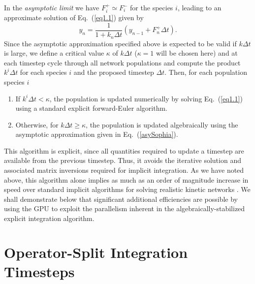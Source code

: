 \documentclass[]{elsart}
\newcommand{\fplus}[1]{F^+_{#1}}
\newcommand{\fminus}[1]{F^-_{#1}}
\newcommand{\eq}[1]{Eq.~(\ref{#1})}
\begin{document}
In the
{\em asymptotic limit} we have $\fplus i \simeq \fminus i$ for the species $i$, leading to
an approximate solution of \eq{eq1.1} given by \cite{guidAsy}
\begin{equation}
y_n = \frac{1}{1+k_n\Delta t} \left(y_{n-1} + F^+_n \Delta t \right).
\label{asySophia}
\end{equation}
Since the asymptotic approximation specified above is expected to be valid if $k\Delta t$
is large, we define a critical value $\kappa$ of $k\Delta t$ ($\kappa = 1$ will be chosen
here) and at each timestep cycle
through all network populations and compute the product $k^i\Delta t$ for each species $i$
and the proposed timestep $\Delta t$.   Then, for each population species $i$
%
\begin{enumerate}
\item
If $k^i\Delta t < \kappa$, the population is updated numerically by solving \eq{eq1.1}
using a standard explicit forward-Euler algorithm.
\item
Otherwise, for $k\Delta t \ge \kappa$, the population is updated algebraically
using the asymptotic approximation given in  \eq{asySophia}.
\end{enumerate}
%
This algorithm is explicit, since all quantities required to update a timestep 
are available from the previous timestep.  Thus, it avoids the iterative 
solution and associated matrix inversions required for implicit integration. As 
we have noted above, this algorithm alone implies as much as an order of 
magnitude increase in speed over standard implicit algorithms for solving 
realistic kinetic networks \cite{guidJCP}.  We shall demonstrate below that 
significant additional efficiencies are possible by using the GPU to exploit the 
parallelism inherent in the algebraically-stabilized explicit integration 
algorithm.

 
\section{\label{operator-split} Operator-Split Integration Timesteps}
\end{document}
